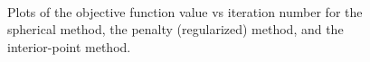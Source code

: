 \documentclass[11pt]{article}
\begin{document}
\begin{figure}[!htbp]
  \centering
   \\
  \caption{Plots of the objective function value vs iteration number for the spherical method, the penalty (regularized) method, and the interior-point method.}
  \label{fig:ObjIter}
\end{figure}
\end{document}
